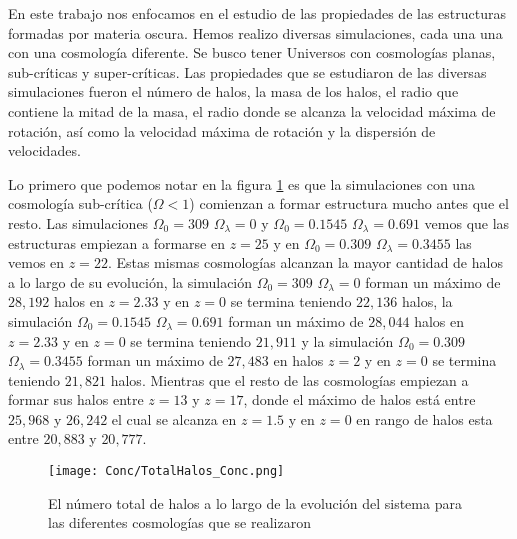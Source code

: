 \renewcommand{\altname}{Conclusiones}
\lhead[\fancyplain{}{}]%
      {\fancyplain{}{\bfseries \altname}}
\addchap{\altname}
En este trabajo nos enfocamos en el estudio de las propiedades de las estructuras formadas por materia oscura. Hemos realizo diversas simulaciones, cada una una con una cosmología diferente. Se busco tener Universos con cosmologías planas, sub-críticas y super-críticas. Las propiedades que se estudiaron de las diversas simulaciones fueron el número de halos, la masa de los halos, el radio que contiene la mitad de la masa, el radio donde se alcanza la velocidad máxima de rotación, así como la velocidad máxima de rotación y la dispersión de velocidades.

Lo primero que podemos notar en la figura \ref{fig:Conc_TotalHalos} es que la simulaciones con una cosmología sub-crítica ($\Omega < 1$) comienzan a formar estructura mucho antes que el resto. Las simulaciones $\Omega_0 = 309$ $\Omega_\lambda=0$ y $\Omega_0=0.1545$ $\Omega_\lambda=0.691$ vemos que las estructuras empiezan a formarse en $z=25$ y en $\Omega_0=0.309$ $\Omega_\lambda=0.3455$ las vemos en $z=22$. Estas mismas cosmologías alcanzan la mayor cantidad de halos a lo largo de su evolución, la simulación $\Omega_0 = 309$ $\Omega_\lambda=0$ forman un máximo de $28,192$ halos en $z=2.33$ y en $z=0$ se termina teniendo $22,136$ halos, la simulación $\Omega_0 = 0.1545$ $\Omega_\lambda=0.691$ forman un máximo de $28,044$ halos en $z=2.33$ y en $z=0$ se termina teniendo $21,911$ y la simulación $\Omega_0 = 0.309$ $\Omega_\lambda=0.3455$ forman un máximo de $27,483$ en halos $z=2$ y en $z=0$ se termina teniendo $21,821$ halos. Mientras que el resto de las cosmologías empiezan a formar sus halos entre $z=13$ y $z=17$, donde el máximo de halos está entre $25,968$ y $26,242$ el cual se alcanza en $z=1.5$ y en $z=0$ en rango de halos esta entre $20,883$ y $20,777$.

\begin{figure}[H]
      \centering
      \texttt{[image: Conc/TotalHalos\_Conc.png]}
      \caption[Evolución del total de halos para todas las cosmologías]{El número total de halos a lo largo de la evolución del sistema para las diferentes cosmologías que se realizaron}
      \label{fig:Conc_TotalHalos}
\end{figure}

